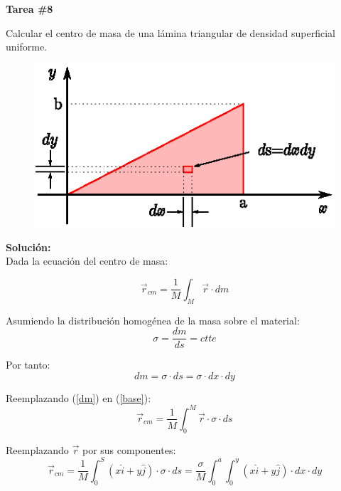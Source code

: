 \documentclass[letter,11pt]{article}
\begin{document}
\begin{center}
    {\Large \bf{Tarea \#8}}
\end{center}

Calcular el centro de masa de una lámina triangular de densidad superficial
uniforme.

\begin{figure}[!h]
\centering
\includegraphics[scale=1.25]{resources/f1.eps}
\end{figure}

\textbf{Solución:} \\

Dada la ecuación del centro de masa:

\begin{equation}
    \vec{r}_{cm} = \frac{1}{M} \int_{M} \vec{r} \cdot dm
\label{base}
\end{equation}

Asumiendo la distribución homogénea de la masa sobre el material:
\begin{equation*}
    \sigma = \frac{dm}{ds} = ctte
\end{equation*}

Por tanto:
\begin{equation}
    dm = \sigma \cdot ds = \sigma \cdot dx \cdot dy
\label{dm}
\end{equation}

Reemplazando (\ref{dm}) en (\ref{base}):
\begin{equation*}
    \vec{r}_{cm} = \frac{1}{M} \int_{0}^{M} \vec{r} \cdot \sigma \cdot ds
\end{equation*}

Reemplazando $\vec{r}$ por sus componentes:
\begin{equation*}
    \vec{r}_{cm} = \frac{1}{M} \int_{0}^{S} (x \hat{i} + y \hat{j}) \cdot \sigma \cdot ds = \frac{\sigma}{M} \int_{0}^{a} \int_{0}^{y} (x \hat{i} + y \hat{j}) \cdot dx \cdot dy
\end{equation*}
\end{document}

